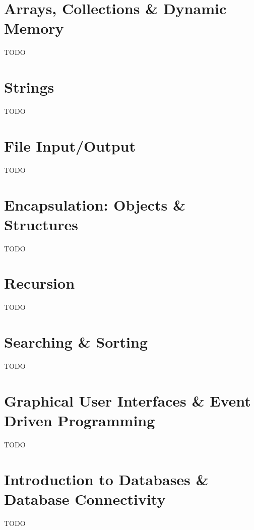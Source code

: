 

\chapter{Arrays, Collections \& Dynamic Memory}
\label{chapter:arrays}

TODO
%
%

\chapter{Strings}
\label{chapter:strings}

TODO
%
%

\chapter{File Input/Output}
\label{chapter:fileIO}

TODO
%
%

\chapter{Encapsulation: Objects \& Structures}
\label{chapter:objects}

TODO
%
%

\chapter{Recursion}

TODO

\chapter{Searching \& Sorting}

TODO

\chapter{Graphical User Interfaces \& Event Driven Programming}
\label{chapter:gui}

TODO

\chapter{Introduction to Databases \& Database Connectivity}

TODO

